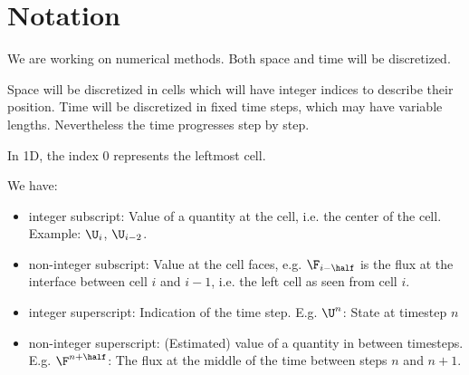 \section{Notation}


We are working on numerical methods.
Both space and time will be discretized.

Space will be discretized in cells which will have integer indices to describe their position.
Time will be discretized in fixed time steps, which may have variable lengths.
Nevertheless the time progresses step by step.

In 1D, the index 0 represents the leftmost cell.

We have:
\begin{itemize}
	\item integer subscript: Value of a quantity at the cell, i.e. the center of the cell. Example: $\U_i$, $\U_{i-2}$.
	\item non-integer subscript: Value at the cell faces, e.g. $\F_{i-\half}$ is the flux at the interface between cell $i$ and $i-1$, i.e. the left cell as seen from cell $i$.
	\item integer superscript: Indication of the time step. E.g. $\U ^ n$: State at timestep $n$
	\item non-integer superscript: (Estimated) value of a quantity in between timesteps. E.g. $\F^{n + \half}$: The flux at the middle of the time between steps $n$ and $n + 1$.
\end{itemize}
